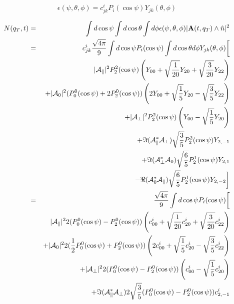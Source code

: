 \documentclass[a4paper,9pt,twoside]{article}
\begin{document}
\pagebreak
\begin{equation}
   \epsilon(\psi,\theta,\phi) = c^{i}_{jk} P_i(\cos\psi)Y_{jk}(\theta,\phi)
   \label{eq:eps_exp}
\end{equation}

\begin{eqnarray}
    N(q_T,t)  &=&  \int d\cos\psi\int d\cos\theta \int d\phi \epsilon(\psi,\theta,\phi) |{\bf A}(t,q_T) \wedge \hat{n}|^2 \\
      &=& c^i_{jk}\frac{\sqrt{4\pi}}{9} \int d\cos\psi   P_i(\cos\psi)  \int d\cos\theta d\phi Y_{jk}(\theta,\phi) 
          \biggl[  \\
          &&                   |{\cal A}_\parallel|^2 P_2^2(\cos\psi) \left( Y_{00}+\sqrt{\frac{1}{20}}Y_{20}+\sqrt{\frac{3}{20}}Y_{22}  \right)  \\
          &&                  +|{\cal A}_0|^2  (P_0^0(\cos\psi)+2P_2^0(\cos\psi) ) \left( 2Y_{00}+\sqrt{\frac{1}{5}}Y_{20}-\sqrt{\frac{3}{5}}Y_{22} \right) \\
          &&                  +|{\cal A}_\perp|^2  P_2^2(\cos\psi) \left( Y_{00} - \sqrt{\frac{1}{5}}Y_{20}\right)\\
          &&                  +\Im({\cal A}_\parallel^*{\cal A}_\perp)\sqrt{\frac{3}{5}}P_2^2(\cos\psi) Y_{2,-1}  \\
          &&                  +\Im({\cal A}_\perp^* {\cal A}_0 )      \sqrt{\frac{6}{5}}P_2^1(\cos\psi)Y_{2,1} \\
          &&                  -\Re({\cal A}_0^*{\cal A}_\parallel  )  \sqrt{\frac{6}{5}}P_2^1(\cos\psi) Y_{2,-2} 
          \biggr] \\
      &=& \frac{\sqrt{4\pi}}{9}  \int d\cos\psi   P_i(\cos\psi) \biggl[  \\
          &&                   |{\cal A}_\parallel|^2 2( P_0^0(\cos\psi) - P_2^0(\cos\psi)  )           \left( c^i_{00}  +\sqrt{\frac{1}{20}}c^i_{20}+\sqrt{\frac{3}{20}}c^i_{22}  \right)  \\
          &&                  +|{\cal A}_0|^2 2 (\frac{1}{2}P_0^0(\cos\psi)+P_2^0(\cos\psi) ) \left( 2 c^i_{00}+\sqrt{\frac{1}{ 5}}c^i_{20}-\sqrt{\frac{3}{ 5}}c^i_{22} \right) \\
          &&                  +|{\cal A}_\perp|^2 2 ( P_0^0(\cos\psi) - P_2^0(\cos\psi)  )              \left( c^i_{00}  -\sqrt{\frac{1}{ 5}}c^i_{20}\right)\\
          &&                  +\Im({\cal A}_\parallel^*{\cal A}_\perp)2\sqrt{\frac{3}{5}} ( P_0^0(\cos\psi) - P_2^0(\cos\psi)  ) c^i_{2,-1}  \\

\end{eqnarray}
\end{document}
